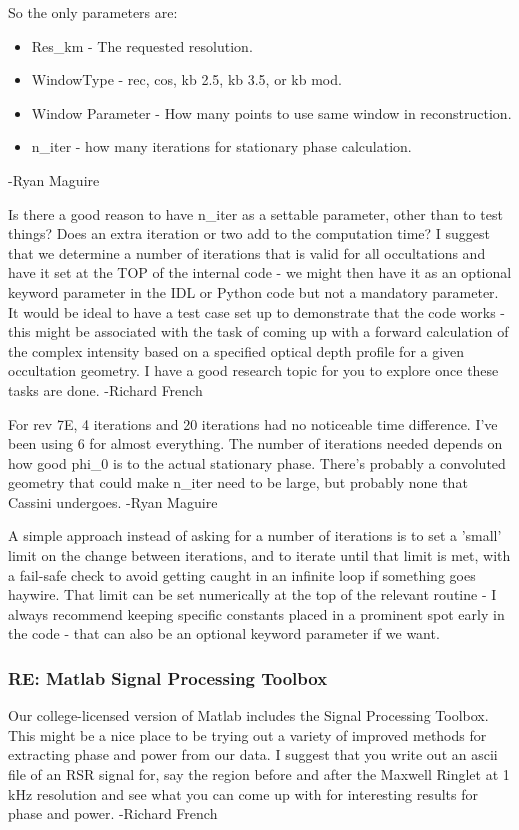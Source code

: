 \documentclass[crop=false,class=book]{standalone}
\begin{document}
So the only parameters are:
\begin{itemize}
    \item Res\_km - The requested resolution.
    \item WindowType - rec, cos, kb 2.5, kb 3.5, or kb mod.
    \item Window Parameter - How many points to use same window in reconstruction.
    \item n\_iter - how many iterations for stationary phase calculation.
\end{itemize}
-Ryan Maguire\par
Is there a good reason to have n\_iter as a settable parameter, other than to test things? Does an extra iteration or two add to the computation time? I suggest that we determine a number of iterations that is valid for all occultations and have it set at the TOP of the internal code - we might then have it as an optional keyword parameter in the IDL or Python code but not a mandatory parameter. It would be ideal to have a test case set up to demonstrate that the code works - this might be associated with the task of coming up with a forward calculation of the complex intensity based on a specified optical depth profile for a given occultation geometry. I have a good research topic for you to explore once these tasks are done. -Richard French\par
For rev 7E, 4 iterations and 20 iterations had no noticeable time difference. I've been using 6 for almost everything. The number of iterations needed depends on how good phi\_0 is to the actual stationary phase. There's probably a convoluted geometry that could make n\_iter need to be large, but probably none that Cassini undergoes. -Ryan Maguire\par
A simple approach instead of asking for a number of iterations is to set a 'small' limit on the change between iterations, and to iterate until that limit is met, with a fail-safe check to avoid getting caught in an infinite loop if something goes haywire. That limit can be set numerically at the top of the relevant routine - I always recommend keeping specific constants placed in a prominent spot early in the code - that can also be an optional keyword parameter if we want.
\subsubsection{\footnotesize RE: Matlab Signal Processing Toolbox}
Our college-licensed version of Matlab includes the Signal Processing Toolbox. This might be a nice place to be trying out a variety of improved methods for extracting phase and power from our data. I suggest that you write out an ascii file of an RSR signal for, say the region before and after the Maxwell Ringlet at 1 kHz resolution and see what you can come up with for interesting results for phase and power. -Richard French
\end{document}
